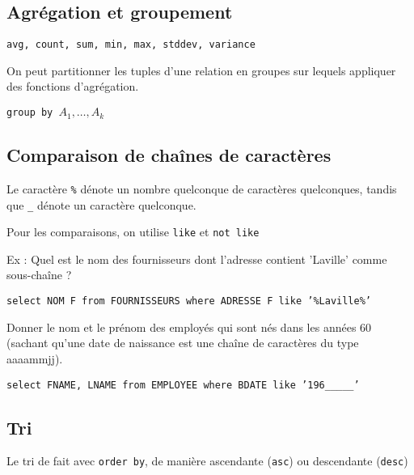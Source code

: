 		\subsection{Agrégation et groupement}
		
		\texttt{avg, count, sum, min, max, stddev, variance}
		
		On peut partitionner les tuples d'une relation en groupes sur lequels appliquer des fonctions d'agrégation.
		
		\texttt{group by $A_1, \dots , A_k$}
		
		\subsection{Comparaison de chaînes de caractères}
		
		Le caractère \texttt{\%} dénote un nombre quelconque de caractères quelconques, tandis que \texttt{\_} dénote un caractère quelconque.
		
		Pour les comparaisons, on utilise \texttt{like} et \texttt{not like}
		
		Ex : Quel est le nom des fournisseurs dont l'adresse contient 'Laville' comme sous-chaîne ?
		
		\texttt{select NOM F from FOURNISSEURS where ADRESSE F like '\%Laville\%'}

Donner le nom et le prénom des employés qui sont nés dans les années 60 (sachant qu'une date de naissance est une chaîne de caractères du type
aaaammjj).

\texttt{select FNAME, LNAME from EMPLOYEE where BDATE like '196\_\_\_\_\_'}
		
		\subsection{Tri}
		
		Le tri de fait avec \texttt{order by}, de manière ascendante (\texttt{asc}) ou descendante (\texttt{desc})
		